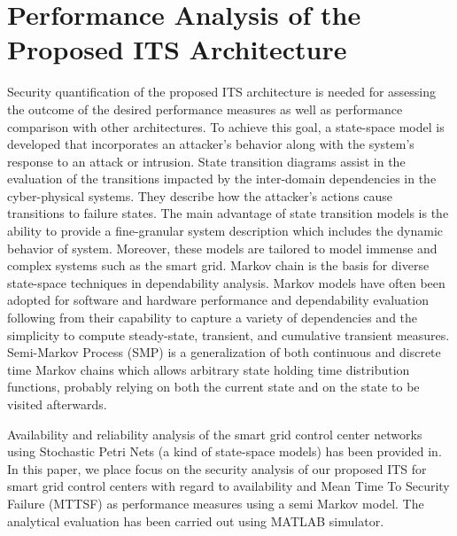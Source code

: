\documentclass[preprint,number,12pt]{elsarticle}
\begin{document}
\section{Performance Analysis of the Proposed ITS Architecture}
\label{sec: performance analysis}
Security quantification of the proposed ITS architecture is needed for assessing the outcome of the desired performance measures as well as performance comparison with other architectures. To achieve this goal, a state-space model is developed that incorporates an attacker's behavior along with the system's response to an attack or intrusion\citep{Uemura2010,Madan2004167,Nguyen2009,Griffin2005c}. State transition diagrams assist in the evaluation of the transitions impacted by the inter-domain dependencies in the cyber-physical systems. They describe how the attacker's actions cause transitions to failure states\citep{Sridhar2012}. The main advantage of state transition models is the ability to provide a fine-granular system description which includes the dynamic behavior of system\citep{Helvik2008209}. Moreover, these models are tailored to model immense and complex systems such as the smart grid. Markov chain is the basis for diverse state-space techniques in dependability analysis\citep{Zeng2012}. Markov models have often been adopted for software and hardware performance and dependability evaluation following from their capability to capture a variety of dependencies and the simplicity to compute steady-state, transient, and cumulative transient measures. Semi-Markov Process (SMP) is a generalization of both continuous and discrete time Markov chains which allows arbitrary state holding time distribution functions, probably relying on both the current state and on the state to be visited afterwards\citep{Distefano2012}.

Availability and reliability analysis of the smart grid control center networks using Stochastic Petri Nets (a kind of state-space models) has been provided in\citep{Zeng2012}. In this paper, we place focus on the security analysis of our proposed ITS for smart grid control centers with regard to availability and Mean Time To Security Failure (MTTSF) as performance measures using a semi Markov model. The analytical evaluation has been carried out using MATLAB simulator.
\end{document}
